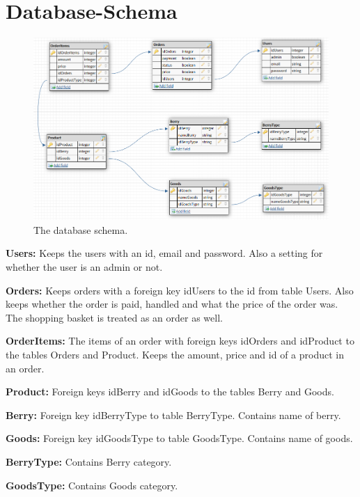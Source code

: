 \newpage

\section{Database-Schema}

\begin{figure}[H]
  \centering
  \includegraphics[width=\textwidth]{new_db_schema.PNG}
  \caption{\label{fig:schema} The database schema.}
\end{figure}


\textbf{Users:} Keeps the users with an id, email and password. Also a
setting for whether the user is an admin or not.

\textbf{Orders:} Keeps orders with a foreign key idUsers to the id from table
Users. Also keeps whether the order is paid, handled and what the price of
the order was. The shopping basket is treated as an order as well.

\textbf{OrderItems:} The items of an order with foreign keys idOrders and
idProduct to the tables Orders and Product.  Keeps the amount, price and id
of a product in an order.

\textbf{Product:} Foreign keys idBerry and idGoods to the tables Berry
and Goods.

\textbf{Berry:} Foreign key idBerryType to table BerryType. Contains name
of berry.

\textbf{Goods:} Foreign key idGoodsType to table GoodsType. Contains name
of goods.

\textbf{BerryType:} Contains Berry category.

\textbf{GoodsType:} Contains Goods category.

